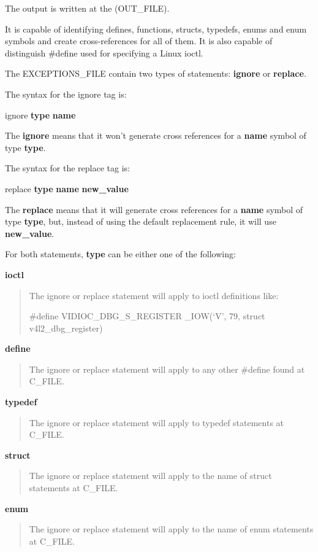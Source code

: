 \documentclass[a4paper,8pt,english]{sphinxmanual}
\begin{document}
The output is written at the (OUT\_FILE).

It is capable of identifying defines, functions, structs, typedefs,
enums and enum symbols and create cross-references for all of them.
It is also capable of distinguish \#define used for specifying a Linux
ioctl.

The EXCEPTIONS\_FILE contain two types of statements: \textbf{ignore} or \textbf{replace}.

The syntax for the ignore tag is:

ignore \textbf{type} \textbf{name}

The \textbf{ignore} means that it won't generate cross references for a
\textbf{name} symbol of type \textbf{type}.

The syntax for the replace tag is:

replace \textbf{type} \textbf{name} \textbf{new\_value}

The \textbf{replace} means that it will generate cross references for a
\textbf{name} symbol of type \textbf{type}, but, instead of using the default
replacement rule, it will use \textbf{new\_value}.

For both statements, \textbf{type} can be either one of the following:

\textbf{ioctl}
\begin{quote}

The ignore or replace statement will apply to ioctl definitions like:

\#define        VIDIOC\_DBG\_S\_REGISTER    \_IOW(`V', 79, struct v4l2\_dbg\_register)
\end{quote}

\textbf{define}
\begin{quote}

The ignore or replace statement will apply to any other \#define found
at C\_FILE.
\end{quote}

\textbf{typedef}
\begin{quote}

The ignore or replace statement will apply to typedef statements at C\_FILE.
\end{quote}

\textbf{struct}
\begin{quote}

The ignore or replace statement will apply to the name of struct statements
at C\_FILE.
\end{quote}

\textbf{enum}
\begin{quote}

The ignore or replace statement will apply to the name of enum statements
at C\_FILE.
\end{quote}
\end{document}
